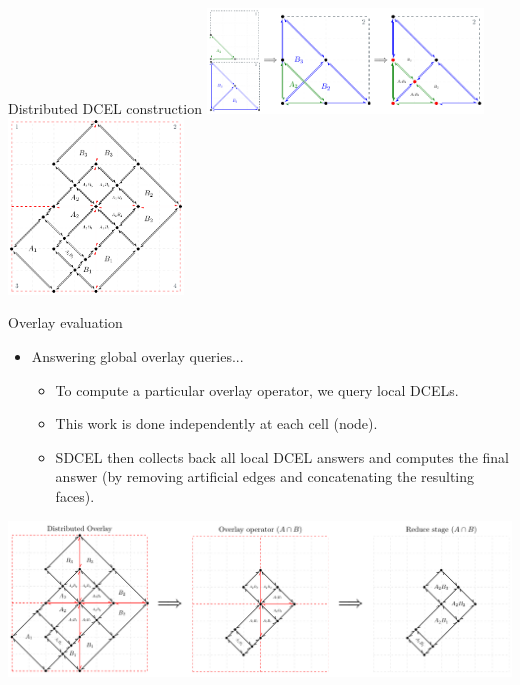 \documentclass{beamer}
\begin{document}
    \begin{frame}{Distributed DCEL construction}
        \centering
        \includegraphics[width=0.55\textwidth]{figures/overlay_partition} \\
        \vspace{0.5cm}
        \includegraphics[width=0.35\textwidth]{figures/distributed_dcel}
    \end{frame}

   \begin{frame}{Overlay evaluation}
        \begin{itemize}
            \item Answering global overlay queries...
            \begin{itemize}
                \item To compute a particular overlay operator, we query local DCELs.
                \item This work is done independently at each cell (node).
                \item SDCEL then collects back all local DCEL answers and computes the final answer (by removing artificial edges and concatenating the resulting faces).
            \end{itemize}
        \end{itemize}
        \vspace{0.5cm}

        \centering
        \includegraphics[width=\textwidth]{figures/overlay_operator}
    \end{frame}
\end{document}
